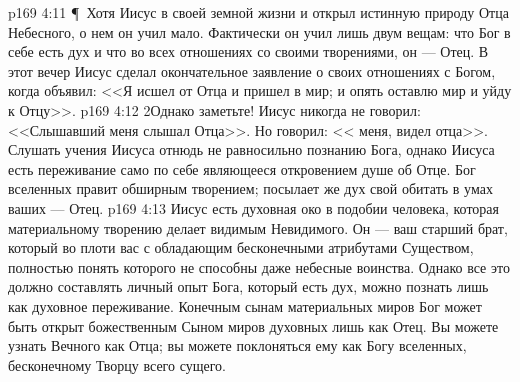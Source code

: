 \vs p169 4:11 \P\ Хотя Иисус в своей земной жизни и открыл истинную природу Отца Небесного, о нем он учил мало. Фактически он учил лишь двум вещам: что Бог в себе есть дух и что во всех отношениях со своими творениями, он --- Отец. В этот вечер Иисус сделал окончательное заявление о своих отношениях с Богом, когда объявил: <<Я исшел от Отца и пришел в мир; и опять оставлю мир и уйду к Отцу>>.
\vs p169 4:12 2Однако заметьте! Иисус никогда не говорил: <<Слышавший меня слышал Отца>>. Но говорил: << меня, видел отца>>. Слушать учения Иисуса отнюдь не равносильно познанию Бога, однако  Иисуса есть переживание само по себе являющееся откровением душе об Отце. Бог вселенных правит обширным творением; посылает же дух свой обитать в умах ваших --- Отец.
\vs p169 4:13 Иисус есть духовная око в подобии человека, которая материальному творению делает видимым Невидимого. Он --- ваш старший брат, который во плоти  вас с обладающим бесконечными атрибутами Существом, полностью понять которого не способны даже небесные воинства. Однако все это должно составлять личный опыт  Бога, который есть дух, можно познать лишь как духовное переживание. Конечным сынам материальных миров Бог может быть открыт божественным Сыном миров духовных лишь как Отец. Вы можете узнать Вечного как Отца; вы можете поклоняться ему как Богу вселенных, бесконечному Творцу всего сущего.
